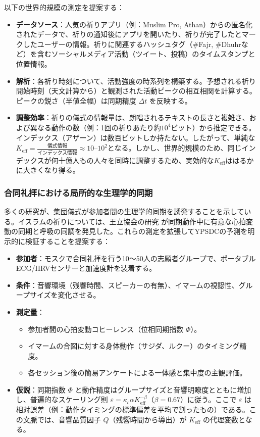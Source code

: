 \documentclass[12pt,a4paper]{article}
\newcommand{\Keff}{K_{\mathrm{eff}}}
\begin{document}
	以下の世界的規模の測定を提案する：
	\begin{itemize}
		\item \textbf{データソース}：人気の祈りアプリ（例：Muslim Pro, Athan）からの匿名化されたデータで、祈りの通知後にアプリを開いたり、祈りが完了したとマークしたユーザーの情報。祈りに関連するハッシュタグ（\#Fajr, \#Dhuhrなど）を含むソーシャルメディア活動（ツイート、投稿）のタイムスタンプと位置情報。
		\item \textbf{解析}：各祈り時刻について、活動強度の時系列を構築する。予想される祈り開始時刻（天文計算から）と観測された活動ピークの相互相関を計算する。ピークの鋭さ（半値全幅）は同期精度 $\Delta t$ を反映する。
		\item \textbf{調整効率}：祈りの儀式の情報量は、朗唱されるテキストの長さと複雑さ、および異なる動作の数（例：1回の祈りあたり約$10^4$ビット）から推定できる。インデックス（アザーン）は数百ビットしか持たない。したがって、単純な$\Keff = \frac{\text{儀式情報}}{\text{インデックス情報}} \approx 10$–$10^2$となる。しかし、世界的規模のため、同じインデックスが何十億人もの人々を同時に調整するため、実効的な$\Keff$ははるかに大きくなり得る。
	\end{itemize}
	
	\subsubsection{合同礼拝における局所的な生理学的同期}
	多くの研究が、集団儀式が参加者間の生理学的同期を誘発することを示している。イスラムの祈りについては、王立協会の研究 \cite{RoyalSociety2024} が同期動作中に有意な心拍変動の同期と呼吸の同調を発見した。これらの測定を拡張してYPSDCの予測を明示的に検証することを提案する：
	\begin{itemize}
		\item \textbf{参加者}：モスクで合同礼拝を行う10～50人の志願者グループで、ポータブルECG/HRVセンサーと加速度計を装着する。
		\item \textbf{条件}：音響環境（残響時間、スピーカーの有無）、イマームの視認性、グループサイズを変化させる。
		\item \textbf{測定量}：
		\begin{itemize}
			\item 参加者間の心拍変動コヒーレンス（位相同期指数 $\Phi$）。
			\item イマームの合図に対する身体動作（サジダ、ルクー）のタイミング精度。
			\item 各セッション後の簡易アンケートによる一体感と集中度の主観評価。
		\end{itemize}
		\item \textbf{仮説}：同期指数 $\Phi$ と動作精度はグループサイズと音響明瞭度とともに増加し、普遍的なスケーリング則 $\varepsilon = \kappa_c \alpha \Keff^{-\beta}$（$\beta=0.67$）に従う。ここで $\varepsilon$ は相対誤差（例：動作タイミングの標準偏差を平均で割ったもの）である。この文脈では、音響品質因子 $Q$（残響時間から導出）が $\Keff$ の代理変数となる。
	\end{itemize}
	
\end{document}

